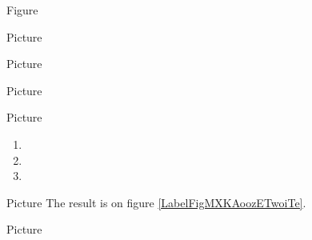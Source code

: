 Figure 
\begin{center}

\end{center}



Picture 
\begin{center}
   
\end{center}
   
\begin{center}
   
\end{center}
   
\begin{center}
   
\end{center}
   



Picture 
\begin{center}
   
\end{center}
   

Picture 
\begin{center}
   
\end{center}
   


Picture 
\begin{center}
   
   
   
\end{center}

\begin{enumerate}
    \item
   
   \item
   
   \item
   
\end{enumerate}

Picture 
The result is on figure \ref{LabelFigMXKAoozETwoiTe}. %
\newcommand{\CaptionFigMXKAoozETwoiTe}{An histogram.}



Picture 
\begin{center}
   
\end{center}


